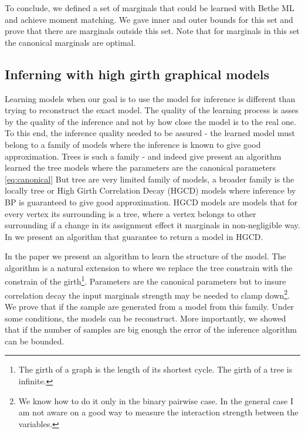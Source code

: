 {To conclude, we defined a set of marginals that could be learned with Bethe ML and achieve moment matching.
We gave inner and outer bounds for this set and prove that there are marginals outside this set.
Note that for marginals in this set the canonical marginals are optimal.  

\subsection{Inferning with high girth graphical models}
Learning models when our goal is to use the model for inference is different than trying to reconstruct the exact model.
The quality of the learning process is asses by the quality of the inference and not by how close the model is to the real one.
To this end, the inference quality needed to be assured  - the learned  model must belong to a family of models where the inference is known to give good approximation.
Trees is such a family - and indeed \cite{chowLiu} give present an algorithm learned the tree models where the parameters are the canonical parameters \eqref{eq:canonical}
But tree are very limited family of models, a broader family is the locally tree or High Girth Correlation Decay (HGCD) models where inference by BP is guaranteed to give good approximation.
HGCD models are models that for every vertex its surrounding is a tree, where a vertex belongs to other surrounding if a change in its assignment effect it marginals in non-negligible way.
In \cite{heinemann2014inferning} we present an algorithm that guarantee to return a model in HGCD.

In the paper we present an algorithm to learn the structure of the model.
The algorithm is a natural extension to \cite{chowLiu} where we replace the tree constrain with the constrain of the girth\footnote{The girth of a graph is the length of its shortest cycle. The girth of a tree is infinite.}.
Parameters are the canonical parameters but to insure correlation decay the input marginals strength may be needed to clamp down\footnote{We know how to do it only in the binary pairwise case. In the general case I am not aware on a good way to measure the interaction strength between the variables.}.
We prove that if the sample are generated from a model from this family.
Under some conditions, the models can be reconstruct.
More importantly, we showed that if the number of samples are big enough the error of the inference algorithm can be bounded.
}
